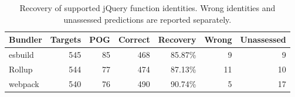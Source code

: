 \begin{table}[t]
\caption{Recovery of supported jQuery function identities. Wrong identities and unassessed predictions are reported separately.}
\label{tab:v8-recovery}
\centering
\small
\begin{tabular}{lrrrrrr}
\toprule
Bundler & Targets & POG & Correct & Recovery & Wrong & Unassessed\\
\midrule
esbuild & 545 & 85 & 468 & 85.87\% & 9 & 9\\
Rollup & 544 & 77 & 474 & 87.13\% & 11 & 10\\
webpack & 540 & 76 & 490 & 90.74\% & 5 & 17\\
\bottomrule
\end{tabular}
\end{table}
